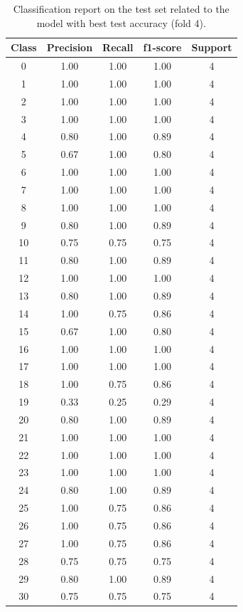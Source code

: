 \documentclass{article}
\begin{document}
\begin{sloppy}
\begin{table}[ht]
  \centering
  \caption{Classification report on the test set related to the model with best test accuracy (fold 4).}
  \label{tab:test_report}
  \begin{tabular}{|c|c|c|c|c|}
  \hline
  Class & Precision & Recall & f1-score & Support \\
  \hline
  0  & 1.00 & 1.00 & 1.00 & 4 \\
  1  & 1.00 & 1.00 & 1.00 & 4 \\
  2  & 1.00 & 1.00 & 1.00 & 4 \\
  3  & 1.00 & 1.00 & 1.00 & 4 \\
  4  & 0.80 & 1.00 & 0.89 & 4 \\
  5  & 0.67 & 1.00 & 0.80 & 4 \\
  6  & 1.00 & 1.00 & 1.00 & 4 \\
  7  & 1.00 & 1.00 & 1.00 & 4 \\
  8  & 1.00 & 1.00 & 1.00 & 4 \\
  9  & 0.80 & 1.00 & 0.89 & 4 \\
  10 & 0.75 & 0.75 & 0.75 & 4 \\
  11 & 0.80 & 1.00 & 0.89 & 4 \\
  12 & 1.00 & 1.00 & 1.00 & 4 \\
  13 & 0.80 & 1.00 & 0.89 & 4 \\
  14 & 1.00 & 0.75 & 0.86 & 4 \\
  15 & 0.67 & 1.00 & 0.80 & 4 \\
  16 & 1.00 & 1.00 & 1.00 & 4 \\
  17 & 1.00 & 1.00 & 1.00 & 4 \\
  18 & 1.00 & 0.75 & 0.86 & 4 \\
  19 & 0.33 & 0.25 & 0.29 & 4 \\
  20 & 0.80 & 1.00 & 0.89 & 4 \\
  21 & 1.00 & 1.00 & 1.00 & 4 \\
  22 & 1.00 & 1.00 & 1.00 & 4 \\
  23 & 1.00 & 1.00 & 1.00 & 4 \\
  24 & 0.80 & 1.00 & 0.89 & 4 \\
  25 & 1.00 & 0.75 & 0.86 & 4 \\
  26 & 1.00 & 0.75 & 0.86 & 4 \\
  27 & 1.00 & 0.75 & 0.86 & 4 \\
  28 & 0.75 & 0.75 & 0.75 & 4 \\
  29 & 0.80 & 1.00 & 0.89 & 4 \\
  30 & 0.75 & 0.75 & 0.75 & 4 \\

\end{tabular}
\end{table}
\end{sloppy}
\end{document}
